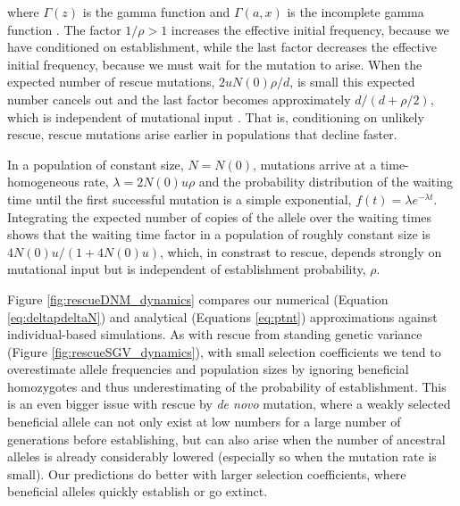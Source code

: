 \documentclass[]{article}
\begin{document}
where $\Gamma(z)$ is the gamma function \citep[equation 6.1.1 in][]{abramowitz1972handbook} and $\Gamma(a,x)$ is the incomplete gamma function \citep[equation 6.5.3 in][]{abramowitz1972handbook}.
The factor $1/\rho>1$ increases the effective initial frequency, because we have conditioned on establishment, while the last factor decreases the effective initial frequency, because we must wait for the mutation to arise.
When the expected number of rescue mutations, $ 2 u N(0) \rho / d$, is small this expected number cancels out and the last factor becomes approximately $d/(d+\rho/2)$, which is independent of mutational input \citep{orr2014population}.
That is, conditioning on unlikely rescue, rescue mutations arise earlier in populations that decline faster.

In a population of constant size, $N=N(0)$, mutations arrive at a time-homogeneous rate, $\lambda=2 N(0) u \rho$ and the probability distribution of the waiting time until the first successful mutation is a simple exponential, $f(t) = \lambda e^{-\lambda t}$.
Integrating the expected number of copies of the allele over the waiting times shows that the waiting time factor in a population of roughly constant size is $4N(0)u/(1+4N(0)u)$, which, in constrast to rescue, depends strongly on mutational input but is independent of establishment probability, $\rho$.

Figure \ref{fig:rescueDNM_dynamics} compares our numerical (Equation \ref{eq:deltapdeltaN}) and analytical (Equations \ref{eq:ptnt}) approximations against individual-based simulations.
As with rescue from standing genetic variance (Figure \ref{fig:rescueSGV_dynamics}), with small selection coefficients we tend to overestimate allele frequencies and population sizes by ignoring beneficial homozygotes and thus underestimating of the probability of establishment.
This is an even bigger issue with rescue by \textit{de novo} mutation, where a weakly selected beneficial allele can not only exist at low numbers for a large number of generations before establishing, but can also arise when the number of ancestral alleles is already considerably lowered (especially so when the mutation rate is small).
Our predictions do better with larger selection coefficients, where beneficial alleles quickly establish or go extinct.
\end{document}

